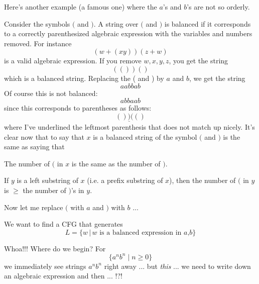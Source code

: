 \newpage
Here's another example (a famous one) where the $a$'s and $b$'s are not
so orderly.

\begin{eg}
Consider the symbols $($ and $)$.
A string over $($ and $)$ is balanced if it corresponds to a correctly
parenthesized algebraic expression with the variables and numbers removed.
For instance 
\[
(w + (xy))(z + w)
\] 
is a valid algebraic expression.
If you remove $w, x, y, z$, you get the string
\[
(())()
\] 
which is a balanced string.
Replacing the ( and ) by $a$ and $b$, we get the string
\[
aabbab
\]
Of course this is not balanced:
\[
abbaab
\]
since this corresponds to parentheses as follows:
\[
()\underline{)}(()
\]
where I've underlined the leftmost parenthesis that does not match up nicely.
It's clear now that to say that $x$ is a balanced string of the symbol
$($ and $)$ is the same as saying that
\begin{tightlist}
\item The number of $($ in $x$ is the same as the number of $)$.
\item If $y$ is a left substring of $x$ (i.e. a prefix substring of $x$),
then the number of $($ in $y$ is $\geq$ the number of $)$'s in $y$. 
\end{tightlist}

Now let me replace $($ with $a$ and $)$ with $b$ ...

We want to find a CFG that generates
\[
L = \{w \,|\,w \text{ is a balanced expression in $a$,$b$} \}
\]

Whoa!!! Where do we begin? For 
\[
\{a^nb^n \mid n \geq 0 \}
\]
we immediately see strings $a^n b^n$ right away ... but \textit{ this} ... we need to write down an algebraic
expression and then ... !?!


\end{eg}
